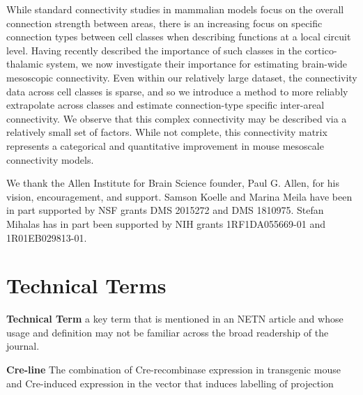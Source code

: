 \documentclass[NETN,manuscript]{stjour-new}
\begin{document}
\begin{authorsummary}
While standard connectivity studies in mammalian models focus on the overall connection strength between areas, there is an increasing focus on specific connection types between cell classes when describing functions at a local circuit level.
Having recently described the importance of such classes in the cortico-thalamic system, we now investigate their importance for estimating brain-wide mesoscopic connectivity.
Even within our relatively large dataset, the connectivity data across cell classes is sparse, and so we introduce a method to more reliably extrapolate across classes and estimate connection-type specific inter-areal connectivity.
We observe that this complex connectivity may be described via a relatively small set of factors. 
While not complete, this connectivity matrix represents a categorical and quantitative improvement in mouse mesoscale connectivity models.

\end{authorsummary}

\newpage


\newpage

\newpage

\newpage


\newpage

\acknowledgments
We thank the Allen Institute for Brain Science founder, Paul G. Allen, for his vision, encouragement, and support.  Samson Koelle and Marina Meila have been in part supported by NSF grants DMS 2015272 and DMS 1810975.  Stefan Mihalas has in part been supported by NIH grants 1RF1DA055669-01 and 1R01EB029813-01.
\newpage



\newpage


\newpage

\section{Technical Terms}

\textbf{Technical Term} a key term that is mentioned in an NETN article and whose usage and definition may not be familiar across the broad readership of the journal. 

\textbf{Cre-line}  The combination of Cre-recombinase expression in transgenic mouse and Cre-induced expression in the vector that induces labelling of projection
\end{document}
